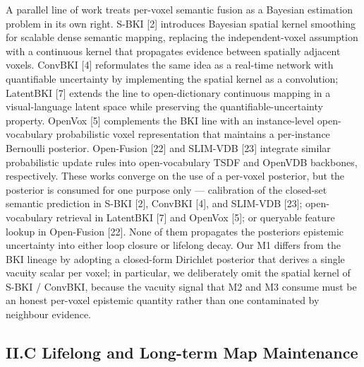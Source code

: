 \documentclass[
]{article}
\begin{document}
A parallel line of work treats per-voxel semantic fusion as a Bayesian
estimation problem in its own right. S-BKI {[}2{]} introduces Bayesian
spatial kernel smoothing for scalable dense semantic mapping, replacing
the independent-voxel assumption with a continuous kernel that
propagates evidence between spatially adjacent voxels. ConvBKI {[}4{]}
reformulates the same idea as a real-time network with quantifiable
uncertainty by implementing the spatial kernel as a convolution;
LatentBKI {[}7{]} extends the line to open-dictionary continuous mapping
in a visual-language latent space while preserving the
quantifiable-uncertainty property. OpenVox {[}5{]} complements the BKI
line with an instance-level open-vocabulary probabilistic voxel
representation that maintains a per-instance Bernoulli posterior.
Open-Fusion {[}22{]} and SLIM-VDB {[}23{]} integrate similar
probabilistic update rules into open-vocabulary TSDF and OpenVDB
backbones, respectively. These works converge on the use of a per-voxel
posterior, but the posterior is consumed for one purpose only ---
calibration of the closed-set semantic prediction in S-BKI {[}2{]},
ConvBKI {[}4{]}, and SLIM-VDB {[}23{]}; open-vocabulary retrieval in
LatentBKI {[}7{]} and OpenVox {[}5{]}; or queryable feature lookup in
Open-Fusion {[}22{]}. None of them propagates the
posterior\textquotesingle s epistemic uncertainty into either loop
closure or lifelong decay. Our M1 differs from the BKI lineage by
adopting a closed-form Dirichlet posterior that derives a single vacuity
scalar per voxel; in particular, we deliberately omit the spatial kernel
of S-BKI / ConvBKI, because the vacuity signal that M2 and M3 consume
must be an honest per-voxel epistemic quantity rather than one
contaminated by neighbour evidence.

\subsection{II.C Lifelong and Long-term Map
Maintenance}\label{iic-lifelong-and-long-term-map-maintenance}
\end{document}
